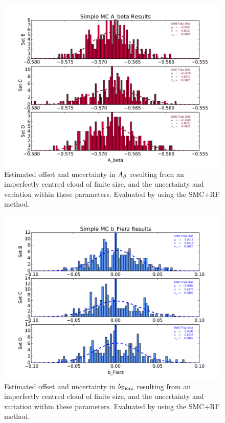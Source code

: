 \begin{figure}[h!!tb]
	\centering
	\includegraphics[width=.999\linewidth]
	{Figures/Position_Err_Abeta.png}
	\caption[$\Abeta$ Position Error]{Estimated offset and uncertainty in $\Abeta$ resulting from an imperfectly centred cloud of finite size, and the uncertainty and variation within these parameters.  Evaluated by using the SMC+RF method.}	
	\label{fig:Abeta_position_err}
\end{figure}

\begin{figure}[h!!tb]
	\centering
	\includegraphics[width=.999\linewidth]
	{Figures/Position_Err_bFierz.png}
	\caption[$\bFierz$ Position Error]{Estimated offset and uncertainty in $\bFierz$ resulting from an imperfectly centred cloud of finite size, and the uncertainty and variation within these parameters.  Evaluated by using the SMC+RF method.}		
	\label{fig:bFierz_position_err}
\end{figure}


